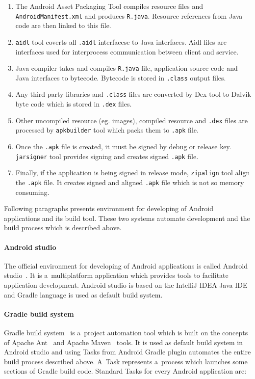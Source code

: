 \begin{enumerate}
    \item The Android Asset Packaging Tool compiles resource files and \texttt{AndroidManifest.xml} and produces
    \texttt{R.java}. Resource references from Java code are then linked to this file.
    \item \texttt{aidl} tool coverts all \texttt{.aidl} interfacese to Java interfaces. Aidl files are interfaces used
    for interprocess communication between client and service.
    \item Java compiler takes and compiles \texttt{R.java} file, application source code and Java interfaces to
    bytecode. Bytecode is stored in \texttt{.class} output files.
    \item Any third party libraries and \texttt{.class} files are converted by Dex tool to Dalvik byte code which is
    stored in \texttt{.dex} files.
    \item Other uncompiled resource (eg. images), compiled resource and \texttt{.dex} files are processed by
    \texttt{apkbuilder} tool which packs them to \texttt{.apk} file.
    \item Once the \texttt{.apk} file is created, it must be signed by debug or release key. \texttt{jarsigner} tool
    provides signing and creates signed \texttt{.apk} file.
    \item Finally, if the application is being signed in release mode, \texttt{zipalign} tool align the \texttt{.apk}
    file. It creates signed and aligned \texttt{.apk} file which is not so memory consuming.
\end{enumerate}

Following paragraphs presents environment for developing of Android applications and its build tool. These two systems
automate development and the build process which is described above.

\paragraph{Android studio}
The official environment for developing of Android applications is called Android studio~\cite{AndroidDev}. It is
a~multiplatform application which provides tools to facilitate application development. Android studio is based on the
IntelliJ IDEA Java IDE and Gradle language is used as default build system.

\paragraph{Gradle build system}
Gradle build system~\cite{Gradle} is a~project automation tool which is built on the concepts of Apache Ant~\cite{Ant}
and Apache Maven~\cite{Maven} tools. It is used as default build system in Android studio and using Tasks from Android
Gradle plugin automates the entire build process described above. A~Task represents a~process which launches some
sections of Gradle build code. Standard Tasks for every Android application are:

